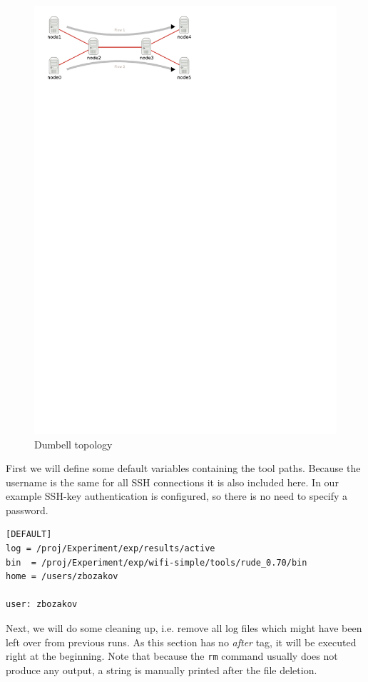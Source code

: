 \begin{figure}
  \centering
  \includegraphics{img/topo_light}  
  \caption{Dumbell topology}
  \label{fig:topo}
\end{figure}

First we will define some default variables containing the tool
paths. Because the username is the same for all SSH connections it is
also included here. In our example SSH-key authentication is
configured, so there is no need to specify a password.

\begin{Verbatim}[fontsize=\footnotesize]
[DEFAULT]
log = /proj/Experiment/exp/results/active
bin  = /proj/Experiment/exp/wifi-simple/tools/rude_0.70/bin
home = /users/zbozakov

user: zbozakov
\end{Verbatim}

Next, we will do some cleaning up, i.e. remove all log files which
might have been left over from previous runs. As this section has no
\emph{after} tag, it will be executed right at the beginning. Note
that because the \Verb=rm= command usually does not produce any
output, a string is manually printed after the file deletion.

